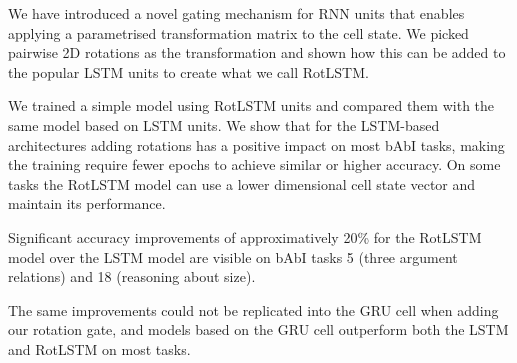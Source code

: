\documentclass{article}
\begin{document}
We have introduced a novel gating mechanism for RNN units that enables applying a parametrised transformation matrix to the cell state. We picked pairwise 2D rotations as the transformation and shown how this can be added to the popular \ac{LSTM} units to create what we call RotLSTM.

We trained a simple model using RotLSTM units and compared them with the same model based on LSTM units. We show that for the LSTM-based architectures adding rotations has a positive impact on most bAbI tasks, making the training require fewer epochs to achieve similar or higher accuracy. On some tasks the RotLSTM model can use a lower dimensional cell state vector and maintain its performance.

Significant accuracy improvements of approximatively 20\% for the RotLSTM model over the LSTM model are visible on bAbI tasks 5 (three argument relations) and 18 (reasoning about size).

The same improvements could not be replicated into the GRU cell when adding our rotation gate, and models based on the GRU cell outperform both the LSTM and RotLSTM on most tasks.







\end{document}
